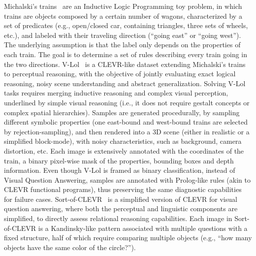 Michalski's trains~\cite{larson1977inductive} are an Inductive Logic Programming toy problem, in which trains are objects composed by a certain number of wagons, characterized by a set of predicates (e.g., open/closed car, containing triangles, three sets of wheels, etc.), and labeled with their traveling direction (``going east'' or ``going west''). The underlying assumption is that the label only depends on the properties of each train. The goal is to determine a set of rules describing every train going in the two directions. %
V-Lol~\cite{helff2023v} is a CLEVR-like dataset extending Michalski's trains to perceptual reasoning, with the objective of jointly evaluating exact logical reasoning, noisy scene understanding and abstract generalization.
Solving V-Lol tasks requires merging inductive reasoning and complex visual perception, underlined by simple visual reasoning (i.e., it does not require gestalt concepts or complex spatial hierarchies).
Samples are generated procedurally, by sampling different symbolic properties (one east-bound and west-bound trains are selected by rejection-sampling), and then rendered into a 3D scene (either in realistic or a simplified block-mode), with noisy characteristics, such as background, camera distortion, etc.
Each image is extensively annotated with the coordinates of the train, a binary pixel-wise mask of the properties, bounding boxes and depth information.
Even though V-Lol is framed as binary classification, instead of Visual Question Answering, samples are annotated with Prolog-like rules (akin to CLEVR functional programs), thus preserving the same diagnostic capabilities for failure cases.
Sort-of-CLEVR~\cite{santoro2017simple} is a simplified version of CLEVR for visual question answering, where both the perceptual and linguistic components are simplified, to directly assess relational reasoning capabilities. Each image in Sort-of-CLEVR is a Kandinsky-like pattern associated with multiple questions with a fixed structure, half of which require comparing multiple objects (e.g., ``how many objects have the same color of the circle?''). 

